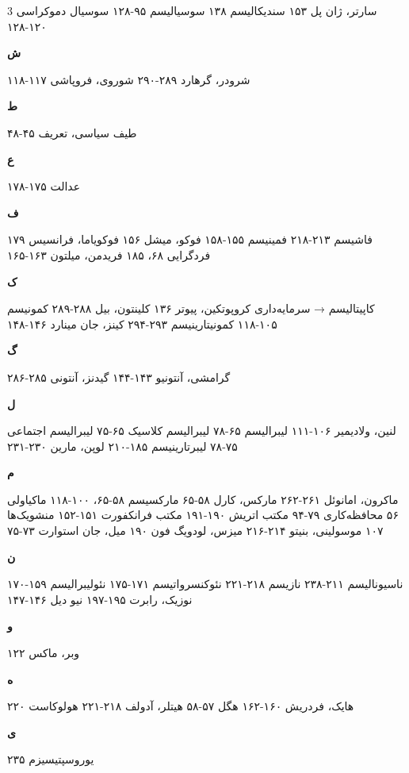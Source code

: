 \begin{multicols}{3}
سارتر، ژان پل ۱۵۳
سندیکالیسم ۱۳۸
سوسیالیسم ۹۵-۱۲۸
سوسیال دموکراسی ۱۲۰-۱۲۸

\textbf{ش}

شرودر، گرهارد ۲۸۹-۲۹۰
شوروی، فروپاشی ۱۱۷-۱۱۸

\textbf{ط}

طیف سیاسی، تعریف ۴۵-۴۸

\textbf{ع}

عدالت ۱۷۵-۱۷۸

\textbf{ف}

فاشیسم ۲۱۳-۲۱۸
فمینیسم ۱۵۵-۱۵۸
فوکو، میشل ۱۵۶
فوکویاما، فرانسیس ۱۷۹
فردگرایی ۶۸، ۱۸۵
فریدمن، میلتون ۱۶۳-۱۶۵

\textbf{ک}

کاپیتالیسم → سرمایه‌داری
کروپوتکین، پیوتر ۱۳۶
کلینتون، بیل ۲۸۸-۲۸۹
کمونیسم ۱۰۵-۱۱۸
کمونیتارینیسم ۲۹۳-۲۹۴
کینز، جان مینارد ۱۴۶-۱۴۸

\textbf{گ}

گرامشی، آنتونیو ۱۴۳-۱۴۴
گیدنز، آنتونی ۲۸۵-۲۸۶

\textbf{ل}

لنین، ولادیمیر ۱۰۶-۱۱۱
لیبرالیسم ۶۵-۷۸
لیبرالیسم کلاسیک ۶۵-۷۵
لیبرالیسم اجتماعی ۷۵-۷۸
لیبرتارینیسم ۱۸۵-۲۱۰
لوپن، مارین ۲۳۰-۲۳۱

\textbf{م}

ماکرون، امانوئل ۲۶۱-۲۶۲
مارکس، کارل ۵۸-۶۵
مارکسیسم ۵۸-۶۵، ۱۰۰-۱۱۸
ماکیاولی ۵۶
محافظه‌کاری ۷۹-۹۴
مکتب اتریش ۱۹۰-۱۹۱
مکتب فرانکفورت ۱۵۱-۱۵۲
منشویک‌ها ۱۰۷
موسولینی، بنیتو ۲۱۴-۲۱۶
میزس، لودویگ فون ۱۹۰
میل، جان استوارت ۷۳-۷۵

\textbf{ن}

ناسیونالیسم ۲۱۱-۲۳۸
نازیسم ۲۱۸-۲۲۱
نئوکنسرواتیسم ۱۷۱-۱۷۵
نئولیبرالیسم ۱۵۹-۱۷۰
نوزیک، رابرت ۱۹۵-۱۹۷
نیو دیل ۱۴۶-۱۴۷

\textbf{و}

وبر، ماکس ۱۲۲

\textbf{ه}

هایک، فردریش ۱۶۰-۱۶۲
هگل ۵۷-۵۸
هیتلر، آدولف ۲۱۸-۲۲۱
هولوکاست ۲۲۰

\textbf{ی}

یوروسپتیسیزم ۲۳۵

\end{multicols}